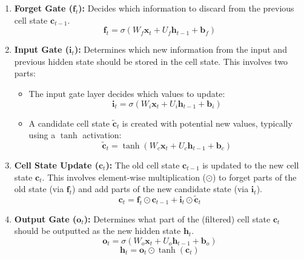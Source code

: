 \begin{enumerate}
  \item \textbf{Forget Gate (\( \bm{f}_t \)):} Decides which information to discard from the previous cell state \( \bm{c}_{t-1} \).
        \begin{equation}
          \bm{f}_t = \sigma(W_f \bm{x}_t + U_f \bm{h}_{t-1} + \bm{b}_f)
          \label{eq:lstm_forget_gate}
        \end{equation}

  \item \textbf{Input Gate (\( \bm{i}_t \)):} Determines which new information from the input and previous hidden state should be stored in the cell state. This involves two parts:
        \begin{itemize}
          \item The input gate layer decides which values to update:
                \begin{equation}
                  \bm{i}_t = \sigma(W_i \bm{x}_t + U_i \bm{h}_{t-1} + \bm{b}_i)
                  \label{eq:lstm_input_gate}
                \end{equation}
          \item A candidate cell state \( \bm{\tilde{c}}_t \) is created with potential new values, typically using a \( \tanh \) activation:
                \begin{equation}
                  \bm{\tilde{c}}_t = \tanh(W_c \bm{x}_t + U_c \bm{h}_{t-1} + \bm{b}_c)
                  \label{eq:lstm_candidate_cell}
                \end{equation}
        \end{itemize}

  \item \textbf{Cell State Update (\( \bm{c}_t \)):} The old cell state \( \bm{c}_{t-1} \) is updated to the new cell state \( \bm{c}_t \). This involves element-wise multiplication (\(\odot\)) to forget parts of the old state (via \( \bm{f}_t \)) and add parts of the new candidate state (via \( \bm{i}_t \)).
        \begin{equation}
          \bm{c}_t = \bm{f}_t \odot \bm{c}_{t-1} + \bm{i}_t \odot \bm{\tilde{c}}_t
          \label{eq:lstm_cell_update}
        \end{equation}

  \item \textbf{Output Gate (\( \bm{o}_t \)):} Determines what part of the (filtered) cell state \( \bm{c}_t \) should be outputted as the new hidden state \( \bm{h}_t \).
        \begin{equation}
          \bm{o}_t = \sigma(W_o \bm{x}_t + U_o \bm{h}_{t-1} + \bm{b}_o)
          \label{eq:lstm_output_gate}
        \end{equation}
        \begin{equation}
          \bm{h}_t = \bm{o}_t \odot \tanh(\bm{c}_t)
          \label{eq:lstm_hidden_state}
        \end{equation}
\end{enumerate}

